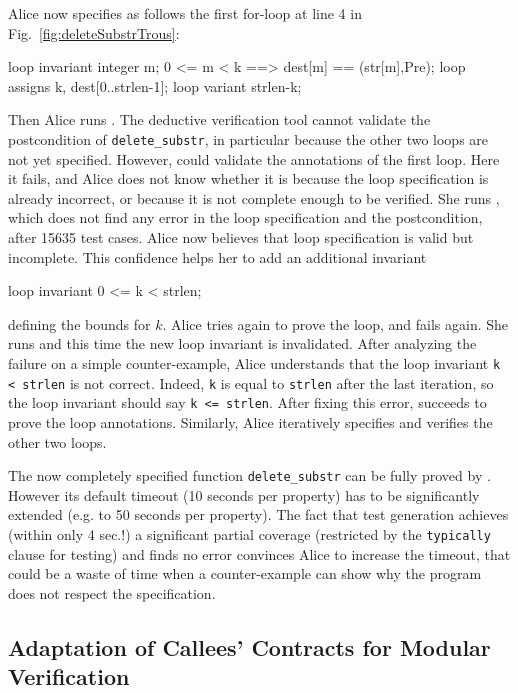 Alice now specifies as follows the first for-loop at line 4 in
Fig.~\ref{fig:deleteSubstrTrous}:
\begin{pretty-codeACSL}
loop invariant \forall integer m; 0 <= m < k ==> dest[m] == \at(str[m],Pre);
loop assigns k, dest[0..strlen-1];
loop variant strlen-k;
\end{pretty-codeACSL}
Then Alice runs \Wp.
The deductive verification tool cannot 
validate the postcondition of \lstinline{delete_substr}, in particular
because the other two loops are not yet specified. 
However, \Wp could validate the
annotations of the first loop. Here it fails,
and Alice does not know whether it is because the loop
specification is already incorrect, or because it is not complete enough to be
verified.
She runs \stady, which does not find any error in the loop specification
and the postcondition, after 15635 test cases. Alice now believes that  loop
specification is valid but incomplete. This confidence helps her 
to add an additional invariant 
\begin{pretty-codeACSL} 
loop invariant 0 <= k < strlen;
\end{pretty-codeACSL} 
defining the bounds for $k$. Alice tries again to prove the loop, and \Wp fails
again. She runs \stady and this time the new loop invariant is invalidated.
After analyzing the failure on a simple counter-example,
Alice understands that the loop invariant \lstinline{k < strlen}
is not correct. Indeed, \lstinline{k} is equal to \lstinline{strlen} after 
the last iteration, so the loop invariant should say \lstinline{k <= strlen}.
After fixing this error, \Wp succeeds to prove the loop annotations.
Similarly, Alice iteratively specifies and verifies the other two loops.


The now completely specified function \lstinline{delete_substr}
can be fully proved by \Wp. 
However its default timeout (10 seconds per property) 
has to be significantly extended (e.g. to 50 seconds per property).
The fact that test generation achieves (within only 4 sec.!) a significant partial coverage 
(restricted by the \lstinline'typically' clause for testing) and finds
no error convinces Alice to increase the timeout,
that could be a waste of time when a counter-example can show why the program
does not respect the specification.


\subsection{Adaptation of Callees' Contracts for Modular Verification}
\label{subsec:callees}


